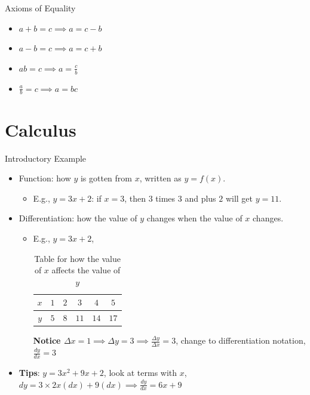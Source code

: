 \documentclass{beamer}
\begin{document}
\begin{frame}[t]{Axioms of Equality}
    \begin{itemize}
        \item $a+b = c  \implies a = c - b$
	\item $a - b = c  \implies a = c + b$
	\item $ab = c  \implies a = \frac{c}{b} $
	\item $\frac{a}{b} = c  \implies a = bc$
    \end{itemize}
\end{frame}

\section{Calculus}%
\label{sec:calculus}

\begin{frame}[t]{Introductory Example}
    \begin{itemize}
	\item Function: how $y$ is gotten from $x$, written as $y = f\left( x \right) $.
	    \begin{itemize}
	        \item E.g.,  $y = 3x+2$: if $x=3$, then $3$ times  $3$ and plus $2$ will get $y=11$.
	    \end{itemize}
	\item Differentiation: how the value of $y$ changes when the value of $x$ changes.
	    \begin{itemize}
	        \item E.g., $y = 3x+2$,
		    \begin{table}[htpb]
		        \centering
		        \caption{Table for how the value of $x$ affects the value of $y$}
		        \label{tab:Table-for-how-the-value-of-x-affects-the-value-of-y-}
		        \begin{tabular}{cccccc}
			    $x$ & $1$ &  $2$ &  $3$ & $4$ & $5$ \\
			    \hline
			    $y$ & $5$ & $8$ & $11$ & $14$ & $17$ \\
		        \end{tabular}
		    \end{table}
		    \textbf{Notice $ \Delta x = 1 \implies  \Delta y = 3  \implies  \frac{ \Delta y}{ \Delta x} = 3 $}, change to differentiation notation, $\frac{dy}{dx}  = 3$
	    \end{itemize}
	\item  \textbf{Tips}: $y = 3x^{2} + 9x  + 2 $, look at terms with $x$,  $dy = 3 \times 2 x\left( dx \right) + 9 \left( dx \right)   \implies \frac{dy}{dx} = 6x+9  $
    \end{itemize}
\end{frame}
\end{document}
